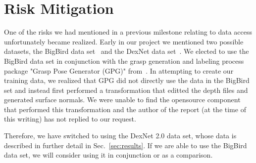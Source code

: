 \documentclass[letterpaper, 10 pt]{article}
\newcommand{\sref}[1]{Sec.~\ref{#1}} %
\begin{document}
\begin{comment}
Given our labeled data, when can then turn to our learning algorithms. 
We will use Tensorflow and Keras to implement our learning algorithms. Keras specifically containes predefined many of the common layers used in deep neural networks.
This will prove useful to run initial prototypes that build upon these common layers. Eventually, we will have to tweak the layers or add layers that are not predefined in Keras.
This is where we will turn to Tensorflow. While Tensorflow already has many basic predefined layers, prototyping in it can be tedious. However Tensorflow provides the fundamental tools for defining custom operations and layers.
There is also an existing ``Model Zoo'' for Keras and Tensorflow. Since many of the proposed architectures have been already trained with the purpose of detecting or classifying objects, one strategy is to properly modify the input layers and
perform Transfer Learning to see if we can reduce the training time significantly in our grasper network when tuning it on the RGBD data. We will also write from scratch several prototypes that apply the concepts of ResNet, Network in Network
and Inception so that we can compare it to other transfered off the shelf models. 
\end{comment}

\section{Risk Mitigation}
\label{sec:risk}
One of the risks we had mentioned in a previous milestone relating to data access unfortunately became realized. 
Early in our project we mentioned two possible datasets, the BigBird data set~\cite{singh2014bigbird} and the DexNet data set~\cite{mahler2017dex}.
We elected to use the BigBird data set in conjunction with the grasp generation and labeling process package "Grasp Pose Generator (GPG)" from~\cite{pas2017grasp}.
In attempting to create our training data, we realized that GPG did not directly use the data in the BigBird set and instead first performed a transformation that editted the depth files and generated surface normals. 
We were unable to find the opensource component that performed this transformation and the author of the report (at the time of this writing) has not replied to our request. 

Therefore, we have switched to using the DexNet 2.0 data set, whose data is described in further detail in \sref{sec:results}. 
If we are able to use the BigBird data set, we will consider using it in conjunction or as a comparison. 
\end{document}
